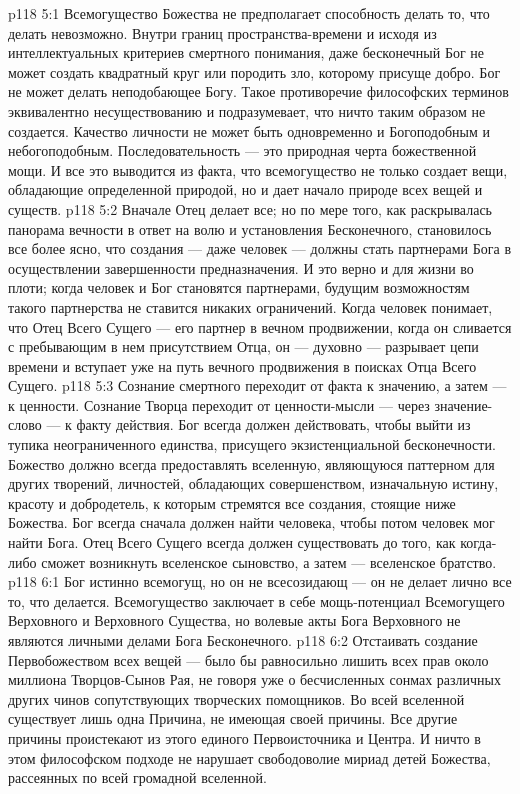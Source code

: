 \vs p118 5:1 Всемогущество Божества не предполагает способность делать то, что делать невозможно. Внутри границ пространства\hyp{}времени и исходя из интеллектуальных критериев смертного понимания, даже бесконечный Бог не может создать квадратный круг или породить зло, которому присуще добро. Бог не может делать неподобающее Богу. Такое противоречие философских терминов эквивалентно несуществованию и подразумевает, что ничто таким образом не создается. Качество личности не может быть одновременно и Богоподобным и небогоподобным. Последовательность --- это природная черта божественной мощи. И все это выводится из факта, что всемогущество не только создает вещи, обладающие определенной природой, но и дает начало природе всех вещей и существ.
\vs p118 5:2 \pc Вначале Отец делает все; но по мере того, как раскрывалась панорама вечности в ответ на волю и установления Бесконечного, становилось все более ясно, что создания --- даже человек --- должны стать партнерами Бога в осуществлении завершенности предназначения. И это верно и для жизни во плоти; когда человек и Бог становятся партнерами, будущим возможностям такого партнерства не ставится никаких ограничений. Когда человек понимает, что Отец Всего Сущего --- его партнер в вечном продвижении, когда он сливается с пребывающим в нем присутствием Отца, он --- духовно --- разрывает цепи времени и вступает уже на путь вечного продвижения в поисках Отца Всего Сущего.
\vs p118 5:3 Сознание смертного переходит от факта к значению, а затем --- к ценности. Сознание Творца переходит от ценности\hyp{}мысли --- через значение\hyp{}слово --- к факту действия. Бог всегда должен действовать, чтобы выйти из тупика неограниченного единства, присущего экзистенциальной бесконечности. Божество должно всегда предоставлять вселенную, являющуюся паттерном для других творений, личностей, обладающих совершенством, изначальную истину, красоту и добродетель, к которым стремятся все создания, стоящие ниже Божества. Бог всегда сначала должен найти человека, чтобы потом человек мог найти Бога. Отец Всего Сущего всегда должен существовать до того, как когда\hyp{}либо сможет возникнуть вселенское сыновство, а затем --- вселенское братство.
\vs p118 6:1 Бог истинно всемогущ, но он не всесозидающ --- он не делает лично все то, что делается. Всемогущество заключает в себе мощь\hyp{}потенциал Всемогущего Верховного и Верховного Существа, но волевые акты Бога Верховного не являются личными делами Бога Бесконечного.
\vs p118 6:2 Отстаивать создание Первобожеством всех вещей --- было бы равносильно лишить всех прав около миллиона Творцов\hyp{}Сынов Рая, не говоря уже о бесчисленных сонмах различных других чинов сопутствующих творческих помощников. Во всей вселенной существует лишь одна Причина, не имеющая своей причины. Все другие причины проистекают из этого единого Первоисточника и Центра. И ничто в этом философском подходе не нарушает свободоволие мириад детей Божества, рассеянных по всей громадной вселенной.
